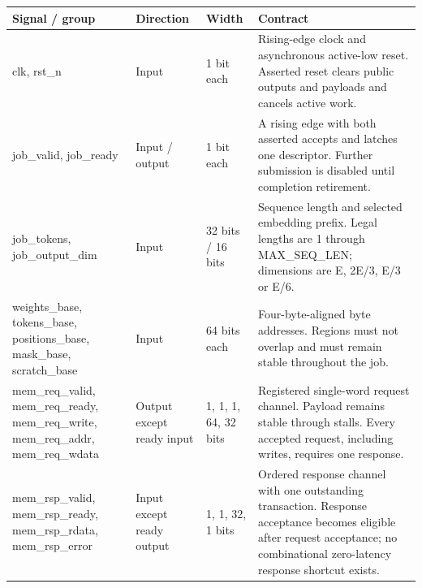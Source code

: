 \documentclass[11pt,a4paper]{article}
\begin{document}
{\small\renewcommand{\arraystretch}{1.18}\begin{longtable}{@{}L{0.21\textwidth}|L{0.12\textwidth}|L{0.12\textwidth}|L{0.45\textwidth}@{}}\toprule

\textbf{Signal /\allowbreak{} group} & \textbf{Direction} & \textbf{Width} & \textbf{Contract}\\\midrule\endhead

clk,\allowbreak{} rst\_\allowbreak{}n & Input & 1 bit each & Rising-edge clock and asynchronous active-low reset. Asserted reset clears public outputs and payloads and cancels active work.\\[2pt]\hline

job\_\allowbreak{}valid,\allowbreak{} job\_\allowbreak{}ready & Input /\allowbreak{} output & 1 bit each & A rising edge with both asserted accepts and latches one descriptor. Further submission is disabled until completion retirement.\\[2pt]\hline

job\_\allowbreak{}tokens,\allowbreak{} job\_\allowbreak{}output\_\allowbreak{}dim & Input & 32 bits /\allowbreak{} 16 bits & Sequence length and selected embedding prefix. Legal lengths are 1 through MAX\_\allowbreak{}SEQ\_\allowbreak{}LEN; dimensions are E,\allowbreak{} 2E/\allowbreak{}3,\allowbreak{} E/\allowbreak{}3 or E/\allowbreak{}6.\\[2pt]\hline

weights\_\allowbreak{}base,\allowbreak{} tokens\_\allowbreak{}base,\allowbreak{} positions\_\allowbreak{}base,\allowbreak{} mask\_\allowbreak{}base,\allowbreak{} scratch\_\allowbreak{}base & Input & 64 bits each & Four-byte-aligned byte addresses. Regions must not overlap and must remain stable throughout the job.\\[2pt]\hline

mem\_\allowbreak{}req\_\allowbreak{}valid,\allowbreak{} mem\_\allowbreak{}req\_\allowbreak{}ready,\allowbreak{} mem\_\allowbreak{}req\_\allowbreak{}write,\allowbreak{} mem\_\allowbreak{}req\_\allowbreak{}addr,\allowbreak{} mem\_\allowbreak{}req\_\allowbreak{}wdata & Output except ready input & 1,\allowbreak{} 1,\allowbreak{} 1,\allowbreak{} 64,\allowbreak{} 32 bits & Registered single-word request channel. Payload remains stable through stalls. Every accepted request,\allowbreak{} including writes,\allowbreak{} requires one response.\\[2pt]\hline

mem\_\allowbreak{}rsp\_\allowbreak{}valid,\allowbreak{} mem\_\allowbreak{}rsp\_\allowbreak{}ready,\allowbreak{} mem\_\allowbreak{}rsp\_\allowbreak{}rdata,\allowbreak{} mem\_\allowbreak{}rsp\_\allowbreak{}error & Input except ready output & 1,\allowbreak{} 1,\allowbreak{} 32,\allowbreak{} 1 bits & Ordered response channel with one outstanding transaction. Response acceptance becomes eligible after request acceptance; no combinational zero-latency response shortcut exists.\\[2pt]\hline


\end{longtable}}
\end{document}
